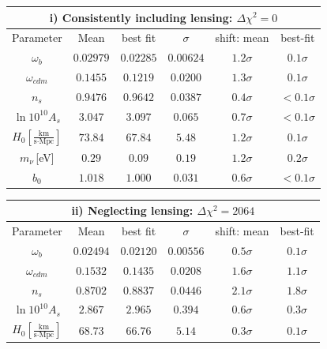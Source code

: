 \begin{table}[!t]
  \centering
  \begin{tabular}{@{}cccccc}
    \hline
    \multicolumn{6}{c}{i) Consistently including lensing: $\Delta \chi^2 = 0$} \\
    \hline
    Parameter & Mean & best fit & $\sigma$ &\hspace{-0.52cm} shift: mean & best-fit \\
    \hline
    $\omega_b$ & $0.02979$ & $0.02285 $ &$0.00624 $ &  \quad$1.2\sigma$ & $ 0.1\sigma$ \\
    $\omega_{cdm}$ & $0.1455 $ & $0.1219 $ & \quad$0.0200 $ &  \quad$1.3\sigma$ & $0.1\sigma$ \\
    $n_s$      & $0.9476 $ & $0.9642 $ & $0.0387 $ &  \quad$0.4\sigma$ & $ <0.1\sigma$ \\
    $\ln10^{10}A_s$ & $3.047 $ & $3.097$ & $0.065 $ &  \quad$0.7\sigma$ & $ <0.1\sigma$ \\
    $H_0\left[\frac{\text{km}}{\text{s}\cdot\text{Mpc}}\right]$      & $73.84$ & $67.84$ & $5.48$ &  \quad$1.2\sigma$ & $ 0.1\sigma$ \\
    $m_{\nu}$\,[eV]  & $0.29$ & $0.09$ & $0.19$ & \quad $ 1.2\sigma$ & $ 0.2\sigma$ \\
    $b_0$ & $1.018$ & $1.000$ & $0.031$ & \quad$0.6\sigma$ & $<0.1\sigma$ \\
  \end{tabular}
  \begin{tabular}{@{}cccccc}
    \hline
    \multicolumn{6}{c}{ii) Neglecting lensing: $\Delta \chi^2 = 2064$} \\
    \hline
    Parameter & Mean & best fit & $\sigma$ & \hspace{-0.52cm} shift: mean & best-fit \\
    \hline
    $\omega_b$ & $0.02494$ & $0.02120 $ & $0.00556 $ &  \quad$0.5\sigma$ & $0.1\sigma$ \\
    $\omega_{cdm}$ & $0.1532$ & $0.1435$ & $0.0208$ &  \quad$1.6\sigma$ & $1.1\sigma$ \\
    $n_s$      & $0.8702$ & $0.8837$ & $0.0446$ &  \quad$2.1\sigma$ & $1.8\sigma$ \\
    $\ln10^{10}A_s$ & $ 2.867 $ & $2.965 $ & $ 0.394 $ &  \quad$0.6\sigma$ & $0.3\sigma$ \\
    $H_0\left[\frac{\text{km}}{\text{s}\cdot\text{Mpc}}\right]$      & $68.73$ & $66.76$ & $5.14$ &  \quad$0.3\sigma$ & $0.1\sigma$ \\

\end{tabular}
\end{table}
